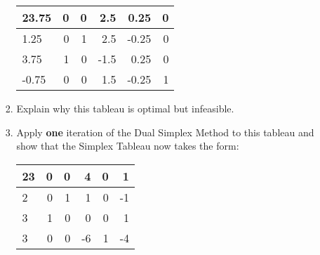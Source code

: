 \documentclass[12pt]{article}
\begin{document}
\begin{itemize}
\begin{enumerate}[(i)]
\begin{enumerate}
					\begin{center}
					\begin{tabular}[h]{|l|rrrrr|}\hline
						23.75     &        0            & 0&          2.5&          0.25&0\\\hline
						1.25&             0&          1&          2.5&         -0.25&0\\
						3.75&          1&             0&         -1.5&          0.25&0\\
						-0.75&0&0&1.5 &-0.25&1\\ \hline
					\end{tabular}
					\end{center}
			
				\item Explain why this tableau is optimal but infeasible.
				\item Apply {\bf one} iteration of the Dual Simplex Method to this tableau and show that  the  Simplex Tableau now takes the form:
				\begin{center}
				\begin{tabular}[h]{|l|rrrrr|}\hline
					23            & 0 &            0 &         4         &    0&          1\\ \hline
					2    &         0 &         1&          1       &      0&         -1\\
					3     &     1  &           0 &            0&             0  &        1\\
					3      &       0   &          0     &    -6&          1   &      -4\\\hline
				\end{tabular}
				\end{center}
				\smallskip
				

\end{enumerate}
\end{enumerate}
\end{itemize}
\end{document}
